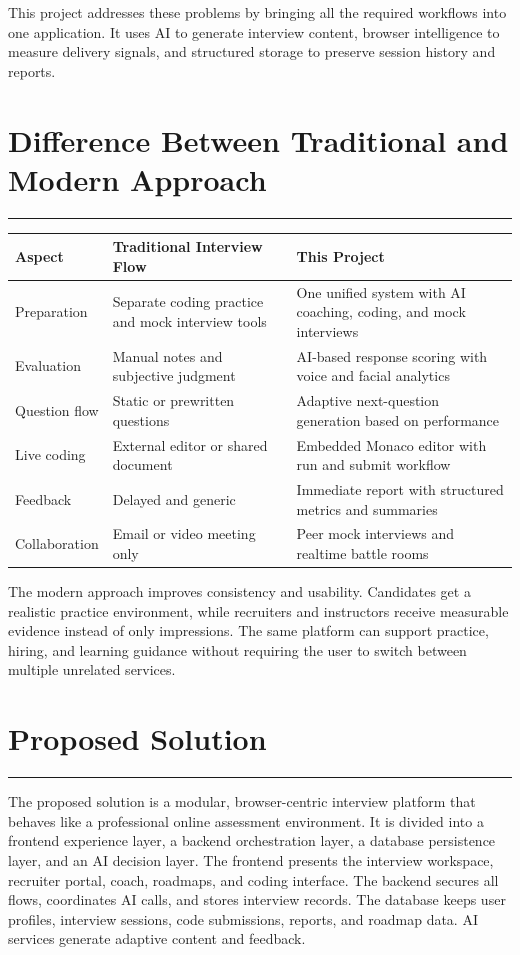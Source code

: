 ﻿\documentclass[12pt,a4paper]{article}
\newcommand{\sectionline}{\vspace{0.4em}\hrule\vspace{0.8em}}
\begin{document}
This project addresses these problems by bringing all the required workflows into one application. It uses AI to generate interview content, browser intelligence to measure delivery signals, and structured storage to preserve session history and reports.

\clearpage

\section{Difference Between Traditional and Modern Approach}
\sectionline
\begin{table}[H]
\centering
\renewcommand{\arraystretch}{1.25}
\begin{tabularx}{\textwidth}{>{\raggedright\arraybackslash}p{3.2cm} >{\raggedright\arraybackslash}X >{\raggedright\arraybackslash}X}
\toprule
\rowcolor{SoftBlue}
\textbf{Aspect} & \textbf{Traditional Interview Flow} & \textbf{This Project} \\
\midrule
Preparation & Separate coding practice and mock interview tools & One unified system with AI coaching, coding, and mock interviews \\
Evaluation & Manual notes and subjective judgment & AI-based response scoring with voice and facial analytics \\
Question flow & Static or prewritten questions & Adaptive next-question generation based on performance \\
Live coding & External editor or shared document & Embedded Monaco editor with run and submit workflow \\
Feedback & Delayed and generic & Immediate report with structured metrics and summaries \\
Collaboration & Email or video meeting only & Peer mock interviews and realtime battle rooms \\
\bottomrule
\end{tabularx}
\end{table}

The modern approach improves consistency and usability. Candidates get a realistic practice environment, while recruiters and instructors receive measurable evidence instead of only impressions. The same platform can support practice, hiring, and learning guidance without requiring the user to switch between multiple unrelated services.

\clearpage

\section{Proposed Solution}
\sectionline
The proposed solution is a modular, browser-centric interview platform that behaves like a professional online assessment environment. It is divided into a frontend experience layer, a backend orchestration layer, a database persistence layer, and an AI decision layer. The frontend presents the interview workspace, recruiter portal, coach, roadmaps, and coding interface. The backend secures all flows, coordinates AI calls, and stores interview records. The database keeps user profiles, interview sessions, code submissions, reports, and roadmap data. AI services generate adaptive content and feedback.
\end{document}
